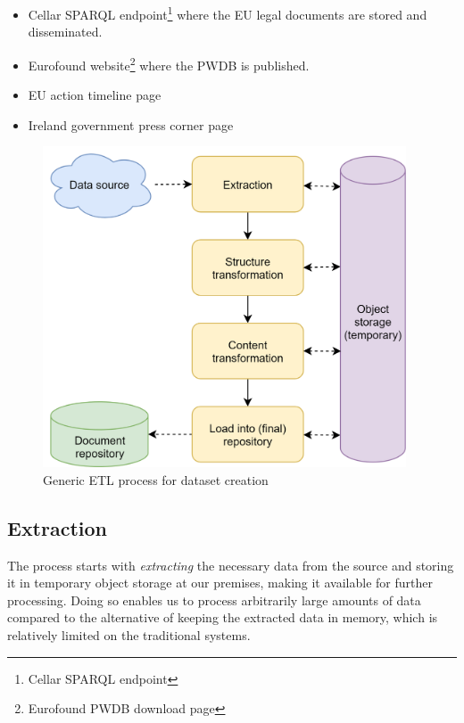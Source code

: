 \begin{itemize}
	\item Cellar SPARQL endpoint\footnote{ Cellar SPARQL endpoint  } where the EU legal documents are stored and disseminated. 
	\item Eurofound website\footnote{ Eurofound PWDB download page } where the PWDB is published.
	\item EU action timeline page

	\item Ireland government press corner page
\end{itemize}

\begin{Center}
\begin{figure}[h]
	\begin{Center}
		\includegraphics[width=4.24in,height=3.75in]{images/image5.png}
		\caption{Generic ETL process for dataset creation}
		\label{fig:Generic_ETL_process_for_dataset_creation}
	\end{Center}
\end{figure}
\end{Center}

\subsection{Extraction}

The process starts with \textit{extracting} the necessary data from the source and storing it in temporary object storage at our premises, making it available for further processing. Doing so enables us to process arbitrarily large amounts of data compared to the alternative of keeping the extracted data in memory, which is relatively limited on the traditional systems. 

